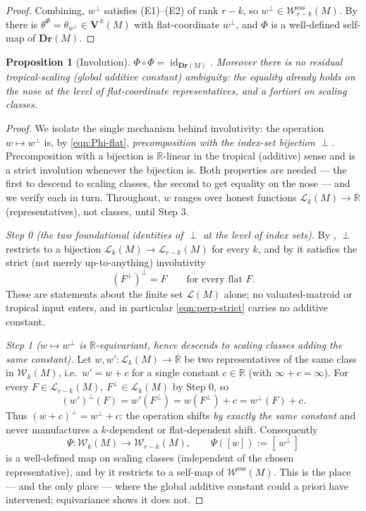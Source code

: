 \documentclass{article}
\newtheorem{proposition}[theorem]{Proposition}
\theoremstyle{definition}
\newcommand{\Rbar}{\overline{\mathbb{R}}}
\newcommand{\R}{\mathbb{R}}
\newcommand{\Dr}{\mathbf{Dr}}
\newcommand{\bV}{\mathbf V}
\newcommand{\cLL}{\mathcal{L}}
\newcommand{\cW}{\mathcal{W}}
\begin{document}
\begin{proof}
Combining, $w^{\perp}$ satisfies (E1)--(E2) of rank $r-k$, so $w^{\perp}\in\cW^{\mathrm{ess}}_{r-k}
(M)$. By  there is $\theta^{\Phi}=\theta_{w^{\perp}}\in\bV^{\,k}(M)$
with flat-coordinate $w^{\perp}$, and $\Phi$ is a well-defined self-map of $\Dr(M)$.
\end{proof}

\begin{proposition}[Involution]\label{prop:inv}
$\Phi\circ\Phi=\operatorname{id}_{\Dr(M)}$. Moreover there is no residual tropical-scaling
(global additive constant) ambiguity: the equality already holds on the nose at the level of
flat-coordinate \emph{representatives}, and a fortiori on scaling classes.
\end{proposition}

\begin{proof}
We isolate the single mechanism behind involutivity: the operation $w\mapsto w^{\perp}$ is, by
\eqref{eqn:Phi-flat}, \emph{precomposition with the index-set bijection} $\perp$. Precomposition with
a bijection is $\R$-linear in the tropical (additive) sense and is a strict involution whenever the
bijection is. Both properties are needed --- the first to descend to scaling classes, the second to
get equality on the nose --- and we verify each in turn. Throughout, $w$ ranges over honest functions
$\cLL_k(M)\to\Rbar$ (representatives), not classes, until Step 3.

\smallskip
\noindent\emph{Step 0 (the two foundational identities of $\perp$ at the level of index sets).}
By , $\perp$ restricts to a bijection $\cLL_k(M)\to\cLL_{r-k}(M)$ for every $k$, and
by  it satisfies the strict (not merely up-to-anything) involutivity
\begin{equation}\label{eqn:perp-strict}
  (F^{\perp})^{\perp}=F\qquad\text{for every flat }F.
\end{equation}
These are statements about the finite set $\cLL(M)$ alone; no valuated-matroid or tropical input
enters, and in particular \eqref{eqn:perp-strict} carries no additive constant.

\smallskip
\noindent\emph{Step 1 ($w\mapsto w^{\perp}$ is $\R$-equivariant, hence descends to scaling classes
adding the same constant).}
Let $w,w'\colon\cLL_k(M)\to\Rbar$ be two representatives of the same class in $\cW_k(M)$, i.e.\
$w'=w+c$ for a single constant $c\in\R$ (with $\infty+c=\infty$). For every $F\in\cLL_{r-k}(M)$,
$F^{\perp}\in\cLL_k(M)$ by Step 0, so
\[
  (w')^{\perp}(F)=w'(F^{\perp})=w(F^{\perp})+c=w^{\perp}(F)+c .
\]
Thus $(w+c)^{\perp}=w^{\perp}+c$: the operation shifts \emph{by exactly the same constant} and never
manufactures a $k$-dependent or flat-dependent shift. Consequently
\[
  \Psi\colon\cW_k(M)\to\cW_{r-k}(M),\qquad \Psi([w]):=[\,w^{\perp}\,]
\]
is a well-defined map on scaling classes (independent of the chosen representative), and by
\Cref{prop:wd} it restricts to a self-map of $\cW^{\mathrm{ess}}(M)$. This is the place --- and the
only place --- where the global additive constant could a priori have intervened; equivariance shows
it does not.


\end{proof}
\end{document}
